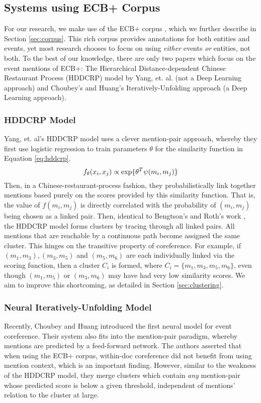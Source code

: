 \subsection{Systems using ECB+ Corpus}
For our research, we make use of the ECB+ corpus \cite{ECB+}, which we further describe in Section \ref{sec:corpus}.  This rich corpus provides annotations for both entities and events, yet most research chooses to focus on using \textit{either} events \textit{or} entities, not both.  To the best of our knowledge, there are only two papers which focus on the event mentions of ECB+: The Hierarchical Distance-dependent Chinese Restaurant Process (HDDCRP) model by Yang, et. al. \cite{journals/tacl/YangCF15} (not a Deep Learning approach) and Choubey's and Huang's Iteratively-Unfolding approach \cite{Choubey2017EventCR} (a Deep Learning approach).

\subsubsection{HDDCRP Model}
\label{sec:HDDCRP}
Yang, et. al's HDDCRP model \cite{journals/tacl/YangCF15} uses a clever mention-pair approach, whereby they first use logistic regression to train parameters $\theta$ for the similarity function in Equation \ref{eq:hddcrp}.  
\begin{equation}
\label{eq:hddcrp}
f_{\theta}(x_i,x_j) \propto \textnormal{exp\{} \theta^T\psi(m_i,m_j)\textnormal{\}}
\end{equation}
Then, in a Chinese-restaurant-process fashion, they probabilistically link together mentions based purely on the scores provided by this similarity function.  That is, the value of $f(m_i,m_j)$ is directly correlated with the probability of $(m_i,m_j)$ being chosen as a linked pair.  Then, identical to Bengtson's and Roth's work \cite{Bengtson:2008:UVF:1613715.1613756}, the HDDCRP model forms clusters by tracing through all linked pairs. All mentions that are reachable by a continuous path become assigned the same cluster.  This hinges on the transitive property of coreference.  For example, if ${(m_1,m_3),(m_3,m_5)}$ and $(m_5,m_6)$ are each individually linked via the scoring function, then a cluster $C_i$ is formed, where $C_i = \{m_1,m_3,m_5,m_6\}$, even though $(m_1,m_5)$ or $(m_3,m_6)$ may have had very low similarity scores. We aim to improve this shortcoming, as detailed in Section \ref{sec:clustering}.

\subsubsection{Neural Iteratively-Unfolding Model}
\label{sec:Choubey}
Recently, Choubey and Huang \cite{Choubey2017EventCR} introduced the first neural model for event coreference.  Their system also fits into the mention-pair paradigm, whereby mentions are predicted by a feed-forward network.  The authors asserted that when using the ECB+ corpus, within-doc coreference did not benefit from using mention context, which is an important finding.  However, similar to the weakness of the HDDCRP model, they merge clusters which contain \textit{any} mention-pair whose predicted score is below a given threshold, independent of mentions' relation to the cluster at large.
